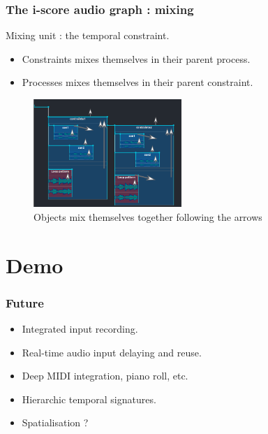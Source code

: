 \documentclass{beamer}
\begin{document}
\begin{frame}
    \frametitle{The i-score audio graph : mixing}    
	\Large
	
    Mixing unit : the temporal constraint.
    
    \begin{itemize}
        \item Constraints mixes themselves in their parent process.
        \item Processes mixes themselves in their parent constraint.
    \end{itemize}
    
	\begin{figure}
		\centering
		\includegraphics[width=0.5\textwidth]{images/mixage.png}
		\caption{Objects mix themselves together following the arrows}
	\end{figure}
\end{frame}


\section{Demo}
\begin{frame}
    \Huge
\end{frame}

\begin{frame}
	\frametitle{Future} 
	\Large
	\begin{itemize}
		\item<1> Integrated input recording.
		\item<2> Real-time audio input delaying and reuse.
		\item<3> Deep MIDI integration, piano roll, etc.
		\item<4> Hierarchic temporal signatures.
        \item<5> Spatialisation ?
		
	\end{itemize}
\end{frame}    
\end{document}
